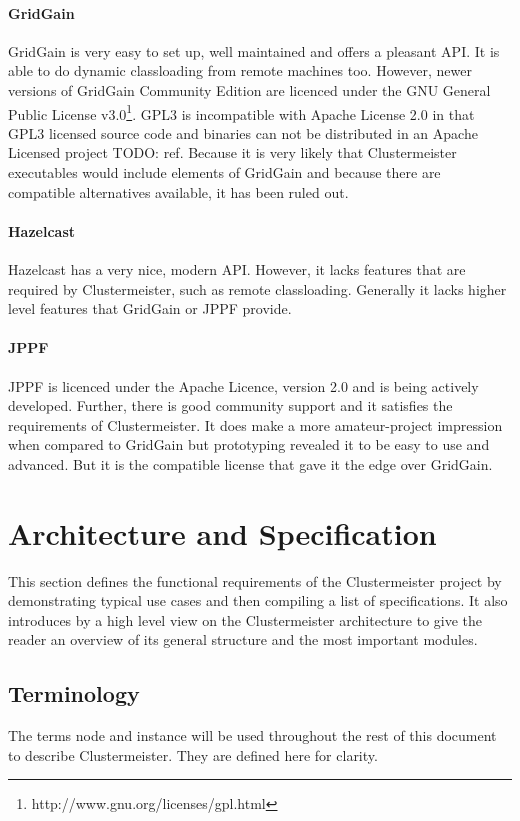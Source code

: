 \documentclass[english]{uzhpub}
\begin{document}
\paragraph{GridGain} GridGain is very easy to set up, well maintained and offers a pleasant API. It is able to do dynamic classloading from remote machines too. However, newer versions of GridGain Community Edition are licenced under the GNU General Public License v3.0\footnote{http://www.gnu.org/licenses/gpl.html}. GPL3 is incompatible with Apache License 2.0 in that GPL3 licensed source code and binaries can not be distributed in an Apache Licensed project TODO: ref. Because it is very likely that Clustermeister executables would include elements of GridGain and because there are compatible alternatives available, it has been ruled out.

\paragraph{Hazelcast} Hazelcast has a very nice, modern API. However, it lacks features that are required by Clustermeister, such as remote classloading. Generally it lacks higher level features that GridGain or JPPF provide.

\paragraph{JPPF} JPPF is licenced under the Apache Licence, version 2.0 and is being actively developed. Further, there is good community support and it satisfies the requirements of Clustermeister. It does make a more amateur-project impression when compared to GridGain but prototyping revealed it to be easy to use and advanced. But it is the compatible license that gave it the edge over GridGain.

\section{Architecture and Specification}
\label{architecture}
This section defines the functional requirements of the Clustermeister project by demonstrating typical use cases and then compiling a list of specifications. It also introduces by a high level view on the Clustermeister architecture to give the reader an overview of its general structure and the most important modules.

\subsection{Terminology}
The terms node and instance will be used throughout the rest of this document to describe Clustermeister. They are defined here for clarity.
 
\end{document}
